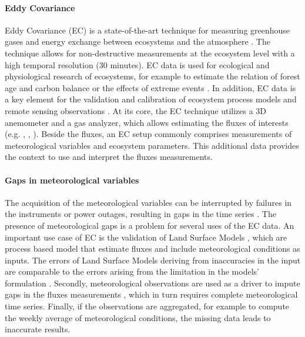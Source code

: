 \documentclass{article}
\begin{document}
\paragraph{Eddy Covariance} Eddy Covariance (EC) is a state-of-the-art technique for measuring greenhouse gases and energy exchange between ecosystems and the atmosphere \cite{aubinet_eddy_2012-1}.  The technique allows for non-destructive measurements at the ecosystem level with a high temporal resolution (30 minutes). EC data is used for ecological and physiological research of ecosystems, for example to estimate the relation of forest age and carbon balance \cite{besnard_quantifying_2018} or the effects of extreme events \cite{mahecha_detecting_2017}. In addition, EC data is a key element for the validation and calibration of ecosystem process models and remote sensing observations \cite{papale_ideas_2020}.
At its core, the EC technique utilizes a 3D anemometer and a gas analyzer, which allows estimating the fluxes of interests (e.g. , , ). Beside the fluxes, an EC setup commonly comprises measurements of meteorological variables and ecosystem parameters. This additional data provides the context to use and interpret the fluxes measurements.

\paragraph{Gaps in meteorological variables} The acquisition of the meteorological variables can be interrupted by failures in the instruments or power outages, resulting in gaps in the time series \cite{aubinet_eddy_2012-1}.
The presence of meteorological gaps is a problem for several uses of the EC data. An important use case of EC is the validation of Land Surface Models \cite{balzarolo_evaluating_2014, friend_fluxnet_2007-1, bonan_improving_2011-1, kramer_evaluation_2002}, which are process based model that estimate fluxes and include meteorological conditions as inputs. The errors of Land Surface Models deriving from inaccuracies in the input are comparable to the errors arising from the limitation in the models' formulation \cite{zhao_how_2012}. 
Secondly, meteorological observations are used as a driver to impute gaps in the fluxes measurements \cite{aubinet_eddy_2012-1}, which in turn requires complete meteorological time series.
Finally, if the observations are aggregated, for example to compute the weekly average of meteorological conditions, the missing data leads to inaccurate results. 
\end{document}

